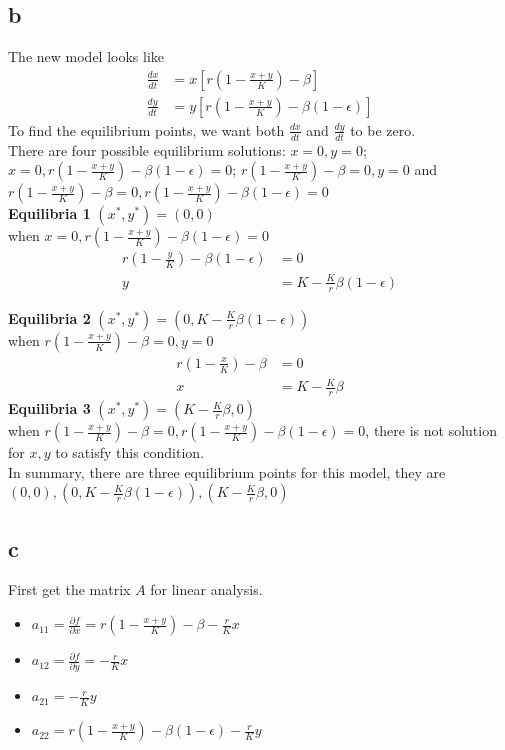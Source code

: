 \documentclass[11pt,letterpaper]{article}
\begin{document}
\subsection*{b}
\noindent The new model looks like 
\begin{align*}
\frac{dx}{dt} &= x[r (1 - \frac{x + y}{K}) - \beta] \\
\frac{dy}{dt} &= y[r(1 - \frac{x+y}{K}) - \beta (1 - \epsilon)]
\end{align*}
\noindent To find the equilibrium points, we want both $\frac{dx}{dt}$ and $\frac{dy}{dt}$ to be zero. \\

\noindent There are four possible equilibrium solutions: $x=0, y=0$; $x=0, r(1 - \frac{x+y}{K}) - \beta (1 - \epsilon)=0$; $r (1 - \frac{x + y}{K}) - \beta=0, y=0$ and $r (1 - \frac{x + y}{K}) - \beta=0, r(1 - \frac{x+y}{K}) - \beta (1 - \epsilon)=0$\\

\noindent \textbf{Equilibria 1} $(x^*, y^*) = (0, 0)$ \\

\noindent when $x=0, r(1 - \frac{x+y}{K}) - \beta (1 - \epsilon)=0$
\begin{align*}
r(1 - \frac{y}{K}) - \beta (1 - \epsilon) &= 0 \\
y &= K - \frac{K}{r} \beta (1 - \epsilon)
\end{align*}

\noindent \textbf{Equilibria 2}  $(x^*, y^*) = (0, K - \frac{K}{r} \beta (1 - \epsilon))$ \\

\noindent when  $r (1 - \frac{x + y}{K}) - \beta=0, y=0$
\begin{align*}
r (1 - \frac{x}{K}) - \beta &=0 \\
x &= K - \frac{K}{r} \beta
\end{align*}
\noindent \textbf{Equilibria 3}  $(x^*, y^*) = (K - \frac{K}{r} \beta, 0)$ \\

\noindent when $r (1 - \frac{x + y}{K}) - \beta=0, r(1 - \frac{x+y}{K}) - \beta (1 - \epsilon)=0$, there is not solution for $x, y$ to satisfy this condition. \\

\noindent In summary, there are three equilibrium points for this model, they are $(0, 0), (0, K - \frac{K}{r} \beta (1 - \epsilon)), (K - \frac{K}{r} \beta, 0)$ \\

\subsection*{c}
\noindent First get the matrix $A$ for linear analysis.
\begin{itemize}
\item $a_{11} = \frac{\partial f}{\partial x} = r (1 - \frac{x+y}{K}) - \beta - \frac{r}{K} x$ 
\item $a_{12} = \frac{\partial f}{\partial y} = - \frac{r}{K}x$
\item $a_{21} = - \frac{r}{K} y$
\item $a_{22} = r (1 - \frac{x+y}{K}) - \beta (1 - \epsilon) - \frac{r}{K} y$
\end{itemize}
\end{document}
